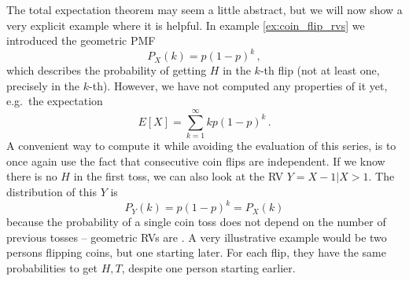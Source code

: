 \begin{ex}[Memorylessness]
The total expectation theorem may seem a little abstract, but we will now show a very explicit example where it is helpful. In example \ref{ex:coin_flip_rvs} we introduced the geometric PMF
\begin{equation*}
P_X(k) = p (1 - p)^k \, ,
\end{equation*}
which describes the probability of getting $H$ in the $k$-th flip (not at least one, precisely in the $k$-th). However, we have not computed any properties of it yet, e.g.~the expectation
\begin{equation*}
E[X] = \sum_{k = 1}^\infty k p (1 - p)^k \, .
\end{equation*}
A convenient way to compute it while avoiding the evaluation of this series, is to once again use the fact that consecutive coin flips are independent. If we know there is no $H$ in the first toss, we can also look at the RV $Y = X - 1 | X > 1$. The distribution of this $Y$ is
\begin{equation*}
P_Y(k) = p (1 - p)^k = P_X(k)
\end{equation*} 
because the probability of a single coin toss does not depend on the number of previous tosses -- geometric RVs are . A very illustrative example would be two persons flipping coins, but one starting later. For each flip, they have the same probabilities to get $H, T$, despite one person starting earlier.\footnotemark%

\end{ex}
